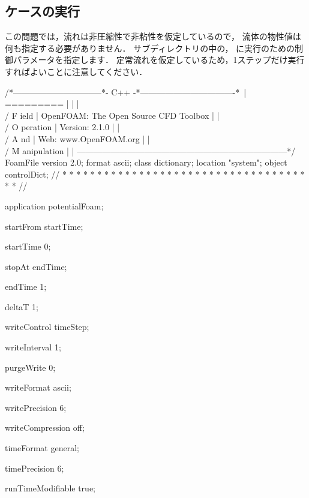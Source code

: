 \subsection{ケースの実行}
\label{ssec:3.1.5}
この問題では，流れは非圧縮性で非粘性を仮定しているので，
流体の物性値は何も指定する必要がありません．
%
%
サブディレクトリの中の，
に実行のための制御パラメータを指定します．
定常流れを仮定しているため，1ステップだけ実行すればよいことに注意してください．
\begin{OFverbatim}
/*--------------------------------*- C++ -*----------------------------------*\
| =========                 |                                                 |
| \\      /  F ield         | OpenFOAM: The Open Source CFD Toolbox           |
|  \\    /   O peration     | Version:  2.1.0                                 |
|   \\  /    A nd           | Web:      www.OpenFOAM.org                      |
|    \\/     M anipulation  |                                                 |
\*---------------------------------------------------------------------------*/
FoamFile
{
    version     2.0;
    format      ascii;
    class       dictionary;
    location    "system";
    object      controlDict;
}
// * * * * * * * * * * * * * * * * * * * * * * * * * * * * * * * * * * * * * //

application     potentialFoam;

startFrom       startTime;

startTime       0;

stopAt          endTime;

endTime         1;

deltaT          1;

writeControl    timeStep;

writeInterval   1;

purgeWrite      0;

writeFormat     ascii;

writePrecision  6;

writeCompression off;

timeFormat      general;

timePrecision   6;

runTimeModifiable true;


\end{OFverbatim}
